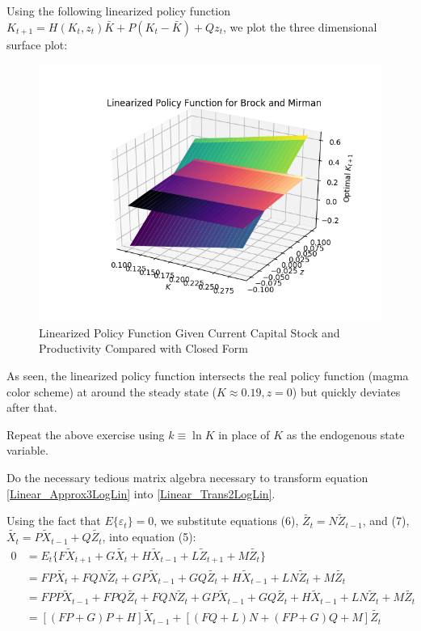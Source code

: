 \documentclass[letterpaper,11pt]{article}
\theoremstyle{definition}
\begin{document}
\begin{spacing}{1.5}
	Using the following linearized policy function $K_{t+1} = H(K_t,z_t) \bar{K}+P(K_t-\bar{K})+Qz_t$, we plot the three dimensional surface plot:

	\begin{figure}[H]
		\caption{Linearized Policy Function Given Current Capital Stock and Productivity Compared with Closed Form}
		\label{fig:brock_and_mirman}
		\includegraphics[width=\textwidth]{Brock_and_Merman_linearized_policy.png}
	\end{figure}

	As seen, the linearized policy function intersects the real policy function (magma color scheme) at around the steady state ($K \approx 0.19, z = 0$) but quickly deviates after that.

	\begin{Exercise} \label{Linear_HW_BM_Coeffs_Log}
		Repeat the above exercise using $k \equiv \ln K$ in place of $K$ as the endogenous state variable.
	\end{Exercise}

	\begin{Exercise} \label{Linear_HW_Algebra}
		Do the necessary tedious matrix algebra necessary to transform equation \eqref{Linear_Approx3LogLin} into \eqref{Linear_Trans2LogLin}.
	\end{Exercise}

	Using the fact that $E\{\varepsilon_t\}=0$, we substitute equations (6), $\tilde{Z_t}=N\tilde{Z}_{t-1}$, and (7), $\tilde{X_t} = P\tilde{X}_{t-1}+Q\tilde{Z_t}$, into equation (5):
	\begin{align*}
		0 &= E_t\{F\tilde{X}_{t+1}+G\tilde{X_t}+H\tilde{X}_{t-1}+L\tilde{Z}_{t+1}+M\tilde{Z_t}\} \\
		&= FP\tilde{X_t}+FQN\tilde{Z}_{t}+GP\tilde{X}_{t-1}+GQ\tilde{Z_t}+H\tilde{X}_{t-1}+LN\tilde{Z}_{t}+M\tilde{Z_t} \\
		&= FPP\tilde{X}_{t-1}+FPQ\tilde{Z_t}+FQN\tilde{Z}_{t}+GP\tilde{X}_{t-1}+GQ\tilde{Z_t}+H\tilde{X}_{t-1}+LN\tilde{Z}_{t}+M\tilde{Z_t}\\
		&= [(FP+G)P+H]\tilde{X}_{t-1}+[(FQ+L)N+(FP+G)Q+M]\tilde{Z_t}
	\end{align*}


\end{spacing}
\end{document}
